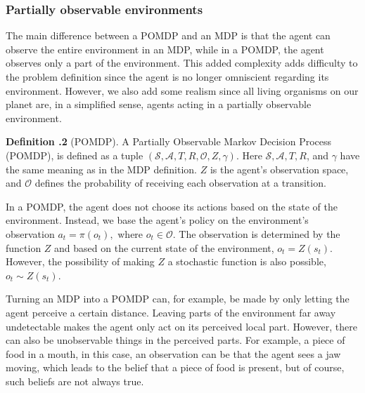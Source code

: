 \documentclass[12pt,A4]{report}
\theoremstyle{definition}
\newtheorem{definition}{Definition}[section]
\begin{document}
\subsubsection{Partially observable environments}

The main difference between a POMDP and an MDP is that the agent can observe the entire environment in an MDP, while in a POMDP, the agent observes only a part of the environment. This added complexity adds difficulty to the problem definition since the agent is no longer omniscient regarding its environment. However, we also add some realism since all living organisms on our planet are, in a simplified sense, agents acting in a partially observable environment.

\begin{displayquote}
  \textbf{Definition \thesection.2} (POMDP). A Partially Observable Markov Decision Process (POMDP), is defined as a tuple $(\mathcal{S}, \mathcal{A}, T, R, \mathcal{O}, Z, \gamma)$. Here $\mathcal{S}, \mathcal{A}, T, R$, and $\gamma$ have the same meaning as in the MDP definition. $Z$ is the agent's observation space, and $\mathcal{O}$ defines the probability of receiving each observation at a transition. 
\end{displayquote}
In a POMDP, the agent does not choose its actions based on the state of the environment. Instead, we base the agent's policy on the environment's observation $a_t = \pi(o_t), \text{ where } o_t \in \mathcal{O}$. The observation is determined by the function $Z$ and based on the current state of the environment, $o_t = Z(s_t)$. However, the possibility of making $Z$ a stochastic function is also possible, $o_t \sim Z(s_t)$.

Turning an MDP into a POMDP can, for example, be made by only letting the agent perceive a certain distance. Leaving parts of the environment far away undetectable makes the agent only act on its perceived local part. However, there can also be unobservable things in the perceived parts. For example, a piece of food in a mouth, in this case, an observation can be that the agent sees a jaw moving, which leads to the belief that a piece of food is present, but of course, such beliefs are not always true. 

\end{document}
